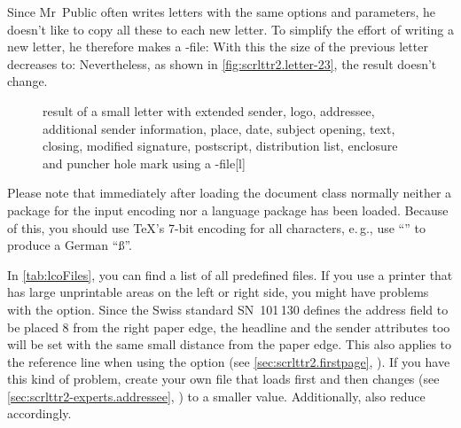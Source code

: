 \begin{Example}
  Since Mr~Public often writes letters with the same options and parameters,
  he doesn't like to copy all these to each new letter. To simplify the effort
  of writing a new letter, he therefore makes a -file:%
  With this the size of the previous letter decreases to:
  Nevertheless, as shown in \autoref{fig:scrlttr2.letter-23}, the result
  doesn't change.
  \begin{figure}
    \setcapindent{0pt}%
    \begin{captionbeside}
      {result of a small letter with extended sender, logo, addressee,
        additional sender information, place, date, subject opening, text,
        closing, modified signature, postscript, distribution list, enclosure
        and puncher hole mark using a -file}[l]
    \end{captionbeside}
    \label{fig:scrlttr2.letter-23}
  \end{figure}
\end{Example}

Please note that immediately after loading the
document class normally neither a package for the input encoding nor a
language package has been loaded. Because of this, you should use \TeX's 7-bit
encoding for all characters, e.\,g., use ``'' to produce a German
``\ss''.

In \autoref{tab:lcoFiles},  you can find a list of
all predefined  files. If you use a printer
that has large unprintable areas on the left or right side, you might have
problems with the  option. Since the Swiss standard
SN~101\,130 defines the address field to be placed 8 from the right
paper edge, the headline and the sender attributes too will be set with the
same small distance from the paper edge. This also applies to the reference
line when using the  option (see
\autoref{sec:scrlttr2.firstpage},
). If you have this
kind of problem, create your own  file that loads  first
and then changes  (see
\autoref{sec:scrlttr2-experts.addressee},
) to a smaller
value. Additionally, also reduce  accordingly.%

